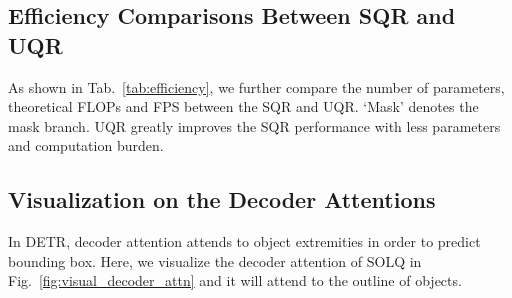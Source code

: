 \documentclass{article}
\begin{document}
\begin{table*}[h]
\caption{Performance comparisons under the Boundary-AP metric on COCO 2017 \textit{val} set.}
\vspace{-0.3cm}
\center
{}
\label{tab:boundary_ap}
\end{table*}

\subsection{Efficiency Comparisons Between SQR and UQR}
\label{effciency_compare}
As shown in Tab.~\ref{tab:efficiency}, we further compare the number of parameters, theoretical FLOPs and FPS between the SQR and UQR. `Mask' denotes the mask branch. UQR greatly improves the SQR performance with less parameters and computation burden.\vspace{-0.1cm}

\begin{table*}[h]
\caption{Comparisons on parameters, FLOPs and FPS between SQR and UQR. All models are evaluated on single Tesla V100 GPU with 512x852 input resolution.}
\vspace{-0.3cm}
\center
{}
\label{tab:efficiency}
\end{table*}

\subsection{Visualization on the Decoder Attentions}
\label{decoder_attention}
In DETR, decoder attention attends to object extremities in order to predict bounding box. Here, we visualize the decoder attention of SOLQ in Fig.~\ref{fig:visual_decoder_attn} and it will attend to the outline of objects. 
\end{document}
